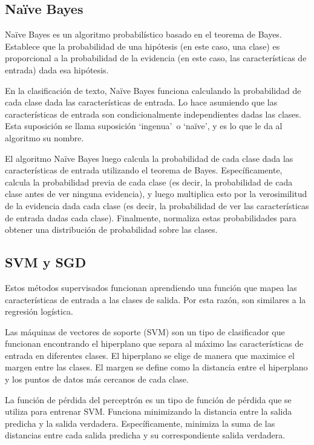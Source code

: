 \subsection{Naïve Bayes}

Naïve Bayes es un algoritmo probabilístico basado en el teorema de Bayes. Establece que la probabilidad de una hipótesis (en este caso, una clase) es proporcional a la probabilidad de la evidencia (en este caso, las características de entrada) dada esa hipótesis.

En la clasificación de texto, Naïve Bayes funciona calculando la probabilidad de cada clase dada las características de entrada. Lo hace asumiendo que las características de entrada son condicionalmente independientes dadas las clases. Esta suposición se llama suposición `ingenua'\ o `naïve', y es lo que le da al algoritmo su nombre.

El algoritmo Naïve Bayes luego calcula la probabilidad de cada clase dada las características de entrada utilizando el teorema de Bayes. Específicamente, calcula la probabilidad previa de cada clase (es decir, la probabilidad de cada clase antes de ver ninguna evidencia), y luego multiplica esto por la verosimilitud de la evidencia dada cada clase (es decir, la probabilidad de ver las características de entrada dadas cada clase). Finalmente, normaliza estas probabilidades para obtener una distribución de probabilidad sobre las clases.

\subsection{SVM y SGD}

Estos métodos supervisados funcionan aprendiendo una función que mapea las características de entrada a las clases de salida. Por esta razón, son similares a la regresión logística.

Las máquinas de vectores de soporte (SVM) son un tipo de clasificador que funcionan encontrando el hiperplano que separa al máximo las características de entrada en diferentes clases. El hiperplano se elige de manera que maximice el margen entre las clases. El margen se define como la distancia entre el hiperplano y los puntos de datos más cercanos de cada clase.

La función de pérdida del perceptrón es un tipo de función de pérdida que se utiliza para entrenar SVM. Funciona minimizando la distancia entre la salida predicha y la salida verdadera. Específicamente, minimiza la suma de las distancias entre cada salida predicha y su correspondiente salida verdadera.

